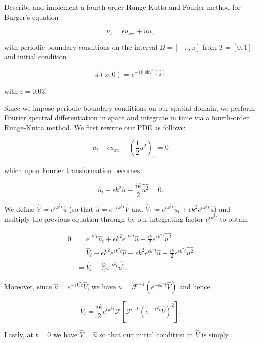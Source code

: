 Describe and implement a fourth-order Runge-Kutta and Fourier method for Burger's equation 

$$
u_t = \epsilon u_{xx} + u u_x
$$

with periodic boundary conditions on the interval $\Omega = [-\pi, \pi]$ from $T = [0, 1]$ and initial condition

$$
u(x, 0) = e^{-10 \sin^2{\left( \frac{x}{2} \right)}}
$$

with $\epsilon = 0.03$.

\begin{solution}
  Since we impose periodic boundary conditions on our spatial domain, we perform Fourier spectral differentiation in 
  space and integrate in time via a fourth-order Runge-Kutta method. We first rewrite our PDE as follows:

  $$
  u_t - \epsilon u_{xx} - \left(\frac{1}{2} u^2 \right)_x = 0
  $$

  which upon Fourier transformation becomes

  $$
  \hat{u}_t + \epsilon k^2 \hat{u} - \frac{ik}{2} \widehat{u^2} = 0.
  $$

  We define $\widehat{V} \coloneqq e^{\epsilon k^2 t} \hat{u}$ (so that $\widehat{u} = e^{-\epsilon k^2 t} \widehat{V}$ 
  and $\widehat{V}_t \coloneqq e^{\epsilon k^2 t} \hat{u}_t + \epsilon k^2 e^{\epsilon k^2 t} \hat{u}$) and multiply 
  the previous equation through by our integrating factor $e^{\epsilon k^2 t}$ to obtain

  \begin{align*}
    0 &= e^{\epsilon k^2 t} \hat{u}_t + \epsilon k^2 e^{\epsilon k^2 t} \hat{u} - \frac{ik}{2} e^{\epsilon k^2 t} \widehat{u^2} \\
      &= \widehat{V}_t - \epsilon k^2 e^{\epsilon k^2 t} \hat{u} + \epsilon k^2 e^{\epsilon k^2 t} \hat{u} - \frac{ik}{2} e^{\epsilon k^2 t} \widehat{u^2} \\
      &= \widehat{V}_t - \frac{ik}{2} e^{\epsilon k^2 t} \widehat{u^2}.
  \end{align*}

  Moreover, since $\hat{u} = e^{-\epsilon k^2 t} \widehat{V}$, we have 
  $u = \mathcal{F}^{-1}\left( e^{-\epsilon k^2 t} \widehat{V} \right)$ and hence

  $$
  \widehat{V}_t = \frac{ik}{2} e^{\epsilon k^2 t} \mathcal{F} \left[ \mathcal{F}^{-1}\left( e^{-\epsilon k^2 t} \widehat{V} \right)^2 \right].
  $$

  Lastly, at $t = 0$ we have $\widehat{V} = \hat{u}$ so that our initial condition in $\widehat{V}$ is simply


\end{solution}
